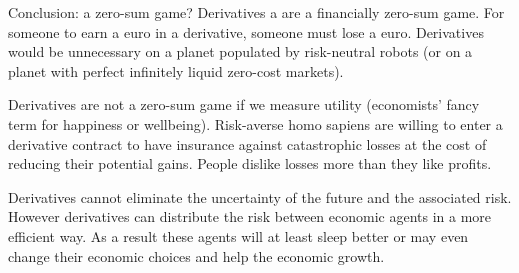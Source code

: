 \documentclass{beamer}
\begin{document}
\begin{frame}{Conclusion: a zero-sum game?}
\justify
Derivatives a are a \alert{financially} zero-sum game. For someone to earn a euro in a derivative, someone must lose a euro. Derivatives would be unnecessary on a planet populated by risk-neutral robots (or on a planet with perfect infinitely liquid zero-cost markets).

\justify
Derivatives are not a zero-sum game if we measure \alert{utility} (economists' fancy term for happiness or wellbeing).  Risk-averse homo sapiens are willing to enter a derivative contract to have insurance against catastrophic losses at the cost of reducing their potential gains. People dislike losses more than they like profits. 

\justify
Derivatives cannot eliminate the uncertainty of the future and the associated risk. However derivatives can distribute the risk between economic agents in a more efficient way. As a result these agents will at least sleep better or may even change their economic choices and help the economic growth.
\end{frame}
\end{document}
